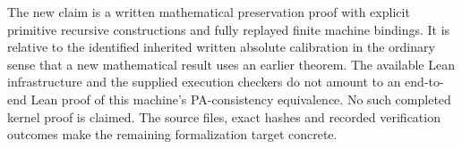 The new claim is a written mathematical preservation proof with
explicit primitive recursive constructions and fully replayed finite
machine bindings.  It is relative to the identified inherited written
absolute calibration in the ordinary sense that a new mathematical
result uses an earlier theorem.  The available Lean infrastructure and
the supplied execution checkers do not amount to an end-to-end Lean
proof of this machine's PA-consistency equivalence.  No such completed
kernel proof is claimed.  The source files, exact hashes and recorded
verification outcomes make the remaining formalization target concrete.
